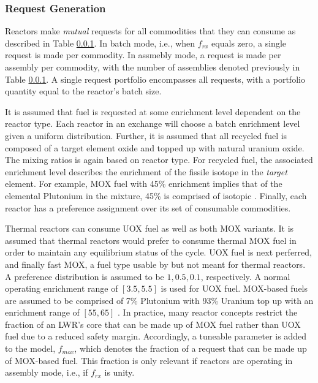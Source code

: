\subsubsection{Request Generation}

Reactors make \textit{mutual} requests for all commodities that they can consume
as described in Table \ref{}. In batch mode, i.e., when $f_{rx}$ equals zero, a
single request is made per commodity. In assmebly mode, a request is made per
assembly per commodity, with the number of assemblies denoted previously in
Table \ref{}. A single request portfolio encompasses all requests, with a
portfolio quantity equal to the reactor's batch size.

It is assumed that fuel is requested at some enrichment level dependent on the
reactor type. Each reactor in an exchange will choose a batch enrichment level
given a uniform distribution. Further, it is assumed that all recycled fuel is
composed of a target element oxide and topped up with natural uranium oxide. The
mixing ratios is again based on reactor type. For recycled fuel, the associated
enrichment level describes the enrichment of the fissile isotope in the
\textit{target} element. For example, MOX fuel with 45\% enrichment implies that
of the elemental Plutonium in the mixture, 45\% is comprised of isotopic
. Finally, each reactor has a preference assignment over its set
of consumable commodities.

Thermal reactors can consume UOX fuel as well as both MOX variants. It is
assumed that thermal reactors would prefer to consume thermal MOX fuel in order
to maintain any equilibrium status of the cycle. UOX fuel is next perferred, and
finally fast MOX, a fuel type usable by but not meant for thermal reactors. A
preference distribution is assumed to be ${1, 0.5, 0.1}$, respectively. A normal
operating enrichment range of $[3.5, 5.5]$ is used for UOX fuel. MOX-based fuels
are assumed to be comprised of 7\% Plutonium with 93\% Uranium top up
\cite{bertel2007management} with an enrichment range of $[55, 65]$
\cite{bairiot2003status}. In practice, many reactor concepts restrict the
fraction of an LWR's core that can be made up of MOX fuel rather than UOX fuel
due to a reduced safety margin. Accordingly, a tuneable parameter is added to
the model, $f_{mox}$, which denotes the fraction of a request that can be made
up of MOX-based fuel. This fraction is only relevant if reactors are operating
in assembly mode, i.e., if $f_{rx}$ is unity.

